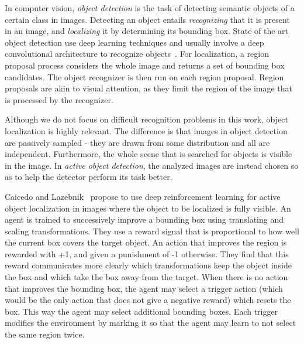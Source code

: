In computer vision, \textit{object detection} is the task of detecting semantic objects of a certain class in images.
Detecting an object entails \textit{recognizing} that it is present in an image, and \textit{localizing} it by determining its bounding box.
State of the art object detection use deep learning techniques and usually involve a deep convolutional architecture to recognize objects~\cite{zhao_objectdetection_2019}.
For localization, a region proposal process considers the whole image and returns a set of bounding box candidates.
The object recognizer is then run on each region proposal.
Region proposals are akin to visual attention, as they limit the region of the image that is processed by the recognizer.

Although we do not focus on difficult recognition problems in this work, object localization is highly relevant.
The difference is that images in object detection are passively sampled - they are drawn from some distribution and all are independent.
Furthermore, the whole scene that is searched for objects is visible in the image.
In \textit{active object detection}, the analyzed images are instead chosen so as to help the detector perform its task better.

Caicedo and Lazebnik~\cite{caicedo_active_2015} propose to use deep reinforcement learning for active object localization in images where the object to be localized is fully visible.
An agent is trained to successively improve a bounding box using translating and scaling transformations.
They use a reward signal that is proportional to how well the current box covers the target object.
An action that improves the region is rewarded with +1, and given a punishment of -1 otherwise.
They find that this reward communicates more clearly which transformations keep the object inside the box and which take the box away from the target.
When there is no action that improves the bounding box, the agent may select a trigger action (which would be the only action that does not give a negative reward) which resets the box.
This way the agent may select additional bounding boxes.
Each trigger modifies the environment by marking it so that the agent may learn to not select the same region twice. %

